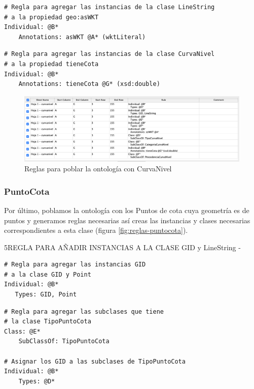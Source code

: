 \begin{lstlisting}
# Regla para agregar las instancias de la clase LineString
# a la propiedad geo:asWKT 
Individual: @B*
	Annotations: asWKT @A* (wktLiteral)
\end{lstlisting}


\begin{lstlisting}
# Regla para agregar las instancias de la clase CurvaNivel
# a la propiedad tieneCota
Individual: @B*
	Annotations: tieneCota @G* (xsd:double)
\end{lstlisting}

\begin{figure}[H]
	\centering
	\includegraphics[width=0.9\linewidth]{imagenes/capitulo5/reglas-curvanivel}
	\caption{Reglas para poblar la ontología con CurvaNivel}
	\label{fig:reglas-curvanivel}
\end{figure}


\subsubsection{PuntoCota}

Por último, poblamos la ontología con los Puntos de cota cuya geometría es de puntos y generamos reglas necesarias así creas las instancias y clases necesarias correspondientes a esta clase (figura \ref{fig:reglas-puntocota}).

5REGLA PARA AÑADIR INSTANCIAS A LA CLASE GID y LineString - 
\begin{lstlisting}
# Regla para agregar las instancias GID 
# a la clase GID y Point
Individual: @B*
   Types: GID, Point
\end{lstlisting}



\begin{lstlisting}
# Regla para agregar las subclases que tiene 
# la clase TipoPuntoCota 
Class: @E*
	SubClassOf: TipoPuntoCota

# Asignar los GID a las subclases de TipoPuntoCota
Individual: @B*
	Types: @D*
\end{lstlisting}

